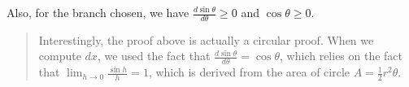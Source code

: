 Also, for the branch chosen, we have $\frac{d\sin\theta}{d\theta} \geq 0$ and $\cos\theta \geq 0$.

\begin{quote}
    Interestingly, the proof above is actually a circular proof. When we compute $dx$, we used the fact that $\frac{d\sin\theta}{d\theta} = \cos\theta$, which relies on the fact that $\lim_{h\to 0} \frac{\sin h}{h} = 1$, which is derived from the area of circle $A = \frac{1}{2}r^2\theta$.
\end{quote}